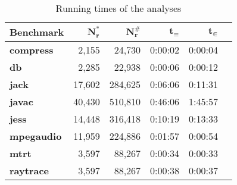 \begin{table}[h]
\caption{Running times of the analyses}\label{tab:runtimes}
\vspace{-.5cm}
\centering
\setlength{\tabcolsep}{2ex}
\begin{tabular}{lrrrrr}
\toprule
\textbf{Benchmark}   & $\bm{N^*_r}$ & $\bm{N^\#_r}$ & $\bm{t_\equiv}$ & $\bm{t_{\Subset}}$ \\ \midrule
\textbf{compress}    & 2,155        & 24,730        & 0:00:02         & 0:00:04            \\
\textbf{db}          & 2,285        & 22,938        & 0:00:06         & 0:00:12            \\
\textbf{jack}        & 17,602       & 284,625       & 0:06:06         & 0:11:31            \\
\textbf{javac}       & 40,430       & 510,810       & 0:46:06         & 1:45:57            \\
\textbf{jess}        & 14,448       & 316,418       & 0:10:19         & 0:13:33           \\
\textbf{mpegaudio}   & 11,959       & 224,886       & 0:01:57         & 0:00:54            \\
\textbf{mtrt}        & 3,597        & 88,267        & 0:00:34         &                   0:00:33 \\
\textbf{raytrace}    & 3,597        & 88,267        & 0:00:38         &                   0:00:37 \\ \bottomrule
\end{tabular}
\end{table}
